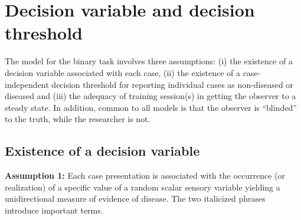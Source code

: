 \documentclass[
]{book}
\begin{document}
\hypertarget{binary-task-model-z-sample-model}{%
\section{Decision variable and decision threshold}\label{binary-task-model-z-sample-model}}

The model for the binary task involves three assumptions: (i) the existence of a decision variable associated with each case, (ii) the existence of a case-independent decision threshold for reporting individual cases as non-diseased or diseased and (iii) the adequacy of training session(s) in getting the observer to a steady state. In addition, common to all models is that the observer is ``blinded'' to the truth, while the researcher is not.

\hypertarget{existence-of-a-decision-variable}{%
\subsection{Existence of a decision variable}\label{existence-of-a-decision-variable}}

\textbf{Assumption 1:} Each case presentation is associated with the occurrence (or realization) of a specific value of a random scalar sensory variable yielding a unidirectional measure of evidence of disease. The two italicized phrases introduce important terms.
\end{document}
